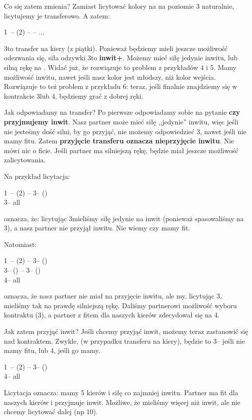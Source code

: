 \documentclass[12pt, a4paper]{article}
\begin{document}
Co się zatem zmienia? Zamiast licytować kolory na na poziomie 3 naturalnie, licytujemy je transferowo.
A zatem:

1\nt\ -- (2\spades) -- \alrts{3\diams} -- ...

3\diams to transfer na kiery (z piątki). Ponieważ będziemy mieli jeszcze możliwość odezwania się,
siła odzywki 3\diams to \textbf{inwit+}. Możemy mieć siłę jedynie inwitu, lub silną rękę na \gf.
Widać już, że rozwiązuje to problem  z przykładów 4 i 5. Mamy możliwość inwitu, nawet jeśli nasz kolor jest
młodszy, niż kolor wejścia. Rozwiązuje to też problem  z przykładu 6: teraz, jeśli finalnie
znajdziemy się w kontrakcie 3\hearts lub 4\hearts, będziemy grać z dobrej ręki.

Jak odpowiadamy na transfer? Po pierwsze odpowiadamy sobie na pytanie \textbf{czy przyjmujemy inwit}.
Nasz partner może mieć siłę ,,jedynie'' inwitu, więc jeśli nie jesteśmy dość silni, by go przyjąć,
nie możemy odpowiedzieć 3\nt, nawet jeśli nie mamy fitu. Zatem \textbf{przyjęcie transferu oznacza
nieprzyjęcie inwitu}. Nie mówi nic o ficie. Jeśli partner ma silniejszą rękę, będzie miał jeszcze
możliwość zalicytowania.

Na przykład licytacja:

1\nt\ -- (2\spades) -- 3\diams -- (\pass)\\
3\hearts -- all \pass

oznacza, że: licytując 3\diams mieliśmy siłę jedynie na inwit (ponieważ spasowaliśmy na 3\hearts),
a nasz partner nie przyjął inwitu. Nie wiemy czy mamy fit.

Natomiast:

1\nt\ -- (2\spades) -- 3\diams -- (\pass)\\
3\hearts -- (\pass) -- 3\nt -- (\pass)\\
4\hearts -- all \pass

oznacza, że nasz partner nie miał na przyjęcie inwitu, ale my, licytując 3\diams, mieliśmy tak na prawdę
silniejszą rękę. Daliśmy partnerowi możliwość wyboru kontraktu (3\nt), a partner z fitem dla naszych
kierów zdecydował się na 4\hearts.

Jak zatem przyjąć inwit? Jeśli chcemy przyjąć inwit, możemy teraz zastanowić się nad kontraktem.
Zwykle, (w przypadku transferu na kiery), będzie to 3\nt -- jeśli nie mamy fitu, lub 4\hearts, jeśli go mamy.

1\nt\ -- (2\spades) -- 3\diams -- (\pass)\\
4\hearts -- all \pass

Licytacja oznacza: mamy 5 kierów i siłę co najmniej inwitu. Partner ma fit dla naszych kierów i
przyjmuje inwit. Możliwe, że mieliśmy więcej niż inwit, ale nie chcemy licytować dalej (np 10\hcp).
\end{document}
